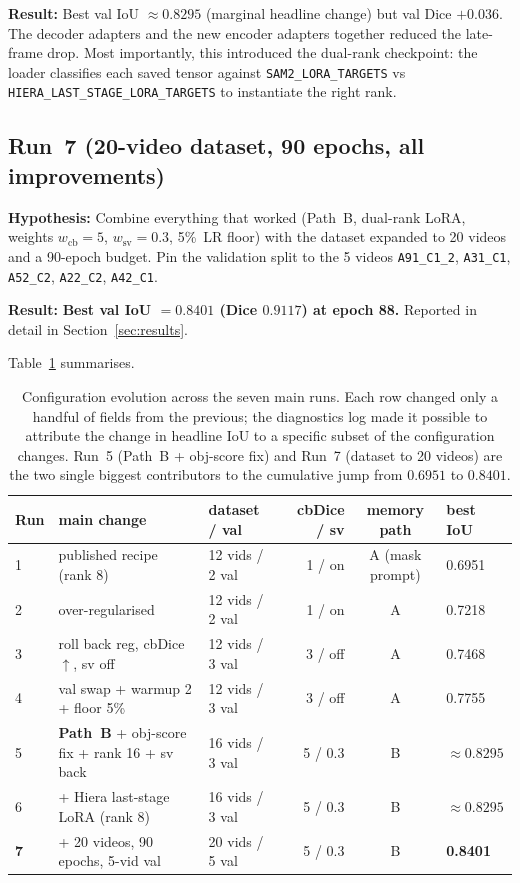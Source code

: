 \documentclass[11pt,a4paper]{article}
\begin{document}
\textbf{Result:} Best val IoU $\approx 0.8295$ (marginal headline
change) but val Dice $+0.036$. The decoder adapters and the new
encoder adapters together reduced the late-frame drop. Most
importantly, this introduced the dual-rank checkpoint: the loader
classifies each saved tensor against \texttt{SAM2\_LORA\_TARGETS} vs
\texttt{HIERA\_LAST\_STAGE\_LORA\_TARGETS} to instantiate the right
rank.

\subsection{Run~7 (20-video dataset, 90 epochs, all improvements)}
\label{sec:run7}

\textbf{Hypothesis:} Combine everything that worked (Path~B, dual-rank
LoRA, weights $w_\text{cb}{=}5$, $w_\text{sv}{=}0.3$, 5\%~LR floor)
with the dataset expanded to 20 videos and a 90-epoch budget. Pin
the validation split to the 5 videos
\texttt{A91\_C1\_2}, \texttt{A31\_C1}, \texttt{A52\_C2},
\texttt{A22\_C2}, \texttt{A42\_C1}.

\textbf{Result:} \textbf{Best val IoU $= 0.8401$ (Dice $0.9117$) at
epoch 88.} Reported in detail in Section~\ref{sec:results}.

\bigskip

Table~\ref{tab:journey} summarises.

\begin{table}[ht!]
\centering
\small
\begin{tabular}{llp{2.5cm}rcl}
\toprule
Run & main change & dataset / val & cbDice / sv & memory path & best IoU \\
\midrule
1 & published recipe (rank 8) & 12 vids / 2 val & 1 / on & A (mask prompt) & 0.6951 \\
2 & over-regularised & 12 vids / 2 val & 1 / on & A & 0.7218 \\
3 & roll back reg, cbDice $\uparrow$, sv off & 12 vids / 3 val & 3 / off & A & 0.7468 \\
4 & val swap + warmup 2 + floor 5\% & 12 vids / 3 val & 3 / off & A & 0.7755 \\
5 & \textbf{Path~B} + obj-score fix + rank 16 + sv back & 16 vids / 3 val & 5 / 0.3 & B & $\approx 0.8295$ \\
6 & + Hiera last-stage LoRA (rank 8) & 16 vids / 3 val & 5 / 0.3 & B & $\approx 0.8295$ \\
\textbf{7} & + 20 videos, 90 epochs, 5-vid val & 20 vids / 5 val & 5 / 0.3 & B & \textbf{0.8401} \\
\bottomrule
\end{tabular}
\caption{Configuration evolution across the seven main runs. Each row
changed only a handful of fields from the previous; the diagnostics
log made it possible to attribute the change in headline IoU to a
specific subset of the configuration changes. Run~5 (Path~B + obj-score
fix) and Run~7 (dataset to 20 videos) are the two single biggest
contributors to the cumulative jump from $0.6951$ to $0.8401$.}
\label{tab:journey}
\end{table}
\end{document}
